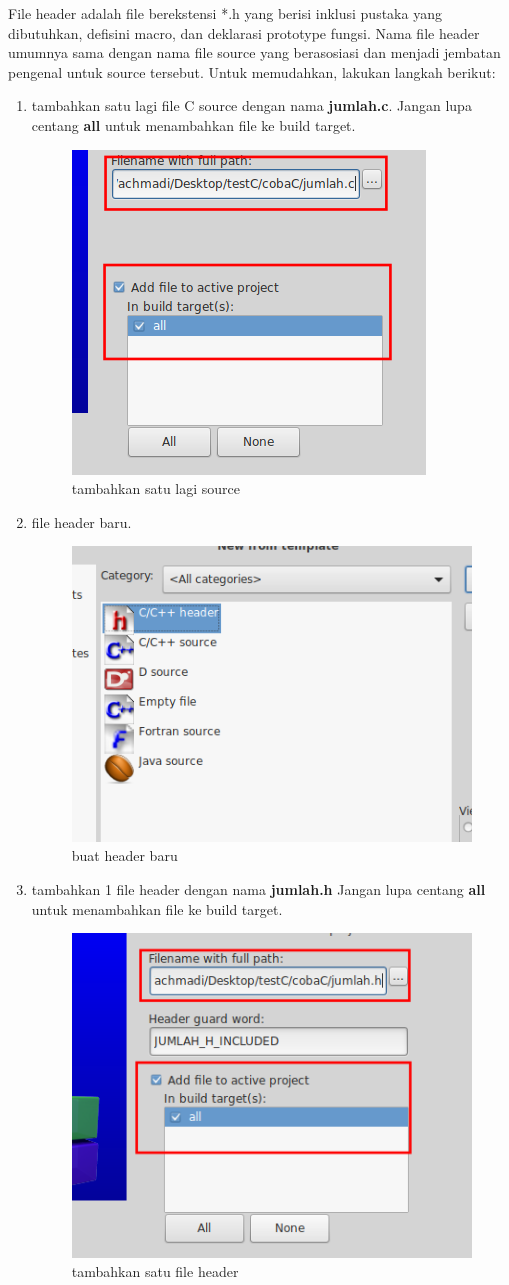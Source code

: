 \documentclass[12pt,]{article}
\begin{document}
	File header adalah file berekstensi *.h yang berisi inklusi pustaka yang dibutuhkan, defisini macro, dan deklarasi prototype fungsi.
	Nama file header umumnya sama dengan nama file source yang berasosiasi dan menjadi jembatan pengenal untuk source tersebut.
	Untuk memudahkan, lakukan langkah berikut:
	\begin{enumerate}
		\item tambahkan satu lagi file C source dengan nama \textbf{jumlah.c}.
		Jangan lupa centang \textbf{all} untuk menambahkan file ke build target.
		\begin{figure}[H]
			\centering
			\includegraphics[width=0.35\linewidth]{images/c_mul_0}
			\caption{tambahkan satu lagi source}
		\end{figure}
	
		\item file header baru.
		\begin{figure}[H]
			\centering
			\includegraphics[width=0.35\linewidth]{images/c_mul_1}
			\caption{buat header baru}
		\end{figure}
	
		\item tambahkan 1 file header dengan nama \textbf{jumlah.h}
		Jangan lupa centang \textbf{all} untuk menambahkan file ke build target.
		\begin{figure}[H]
			\centering
			\includegraphics[width=0.35\linewidth]{images/c_mul_2}
			\caption{tambahkan satu file header}
		\end{figure}
	

\end{enumerate}
\end{document}
